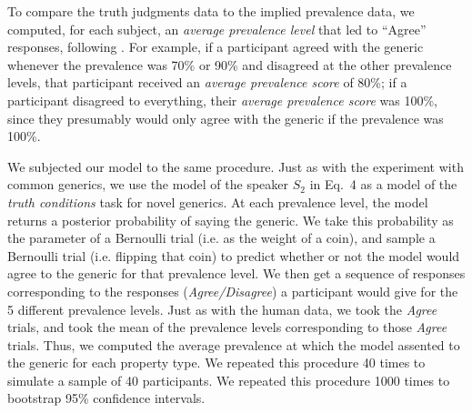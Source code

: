 \documentclass[10pt,letterpaper]{article}
\begin{document}


To compare the truth judgments data to the implied prevalence data, we computed, for each subject, an \emph{average prevalence level} that led to ``Agree'' responses, following .
For example, if a participant agreed with the generic whenever the prevalence was 70\% or 90\% and disagreed at the other prevalence levels, that participant received an \emph{average prevalence score} of 80\%; if a participant disagreed to everything, their \emph{average prevalence score} was 100\%, since they presumably would only agree with the generic if the prevalence was 100\%.

We subjected our model to the same procedure. 
Just as with the experiment with common generics, we use the model of the speaker $S_2$ in Eq.~4 as a model of the \emph{truth conditions} task for novel generics.
At each prevalence level, the model returns a posterior probability of saying the generic. 
We take this probability as the parameter of a Bernoulli trial (i.e. as the weight of a coin), and sample a Bernoulli trial (i.e. flipping that coin) to predict whether or not the model would agree to the generic for that prevalence level. 
We then get a sequence of responses corresponding to the responses (\emph{Agree/Disagree}) a participant would give for the 5 different prevalence levels.
Just as with the human data, we took the \emph{Agree} trials, and took the mean of the prevalence levels corresponding to those \emph{Agree} trials. 
Thus, we computed the average prevalence at which the model assented to the generic for each property type. 
We repeated this procedure 40 times to simulate a sample of 40 participants. 
We repeated this procedure 1000 times to bootstrap 95\% confidence intervals.
\end{document}
